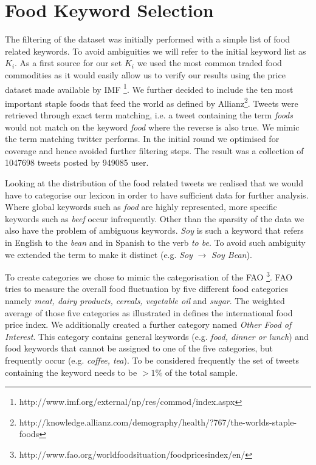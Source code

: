 \documentclass[12pt]{report}
\begin{document}
\section{Food Keyword Selection}

The filtering of the dataset was initially performed with a simple list of food related keywords. To avoid ambiguities we will refer to the initial keyword list as $K_i$. As a first source for our set $K_i$ we used the most common traded food commodities as it would easily allow us to verify our results using the price dataset made available by IMF \footnote{http://www.imf.org/external/np/res/commod/index.aspx}. We further decided to include the ten most important staple foods that feed the world as defined by Allianz\footnote{http://knowledge.allianz.com/demography/health/?767/the-worlds-staple-foods}. Tweets were retrieved through exact term matching, i.e. a tweet containing the term \emph{foods} would not match on the keyword \emph {food} where the reverse is also true. We mimic the term matching twitter performs. In the initial round we optimised for coverage and hence avoided further filtering steps. The result was a collection of 1047698 tweets posted by 949085 user. 


Looking at the distribution of the food related tweets we realised that we would have to categorise our lexicon in order to have sufficient data for further analysis. Where global keywords such as \emph{food} are highly represented, more specific keywords such as \emph{beef} occur infrequently. Other than the sparsity of the data we also have the problem of ambiguous keywords. \emph {Soy} is such a keyword that refers in English to the \emph{bean} and in Spanish to the verb \emph{to be}. To avoid such ambiguity we extended the term to make it distinct (e.g. \emph{Soy} $\to$  \emph{Soy Bean}). 

To create categories we chose to mimic the categorisation of the FAO  \footnote{http://www.fao.org/worldfoodsituation/foodpricesindex/en/}. FAO tries to measure the overall food fluctuation by five different food categories namely \emph{meat, dairy products, cereals, vegetable oil} and \emph {sugar}. The weighted average of those five categories as illustrated in \cite{fao13}  defines the international food price index. We additionally created a further category named \emph{Other Food of Interest}. This category contains general keywords (e.g. \emph{food, dinner or lunch}) and food keywords that cannot be assigned to one of the five categories, but frequently occur (e.g. \emph {coffee, tea}). To be considered frequently the set of tweets containing the keyword needs to be $> 1\%$ of the total sample. 
\end{document}
